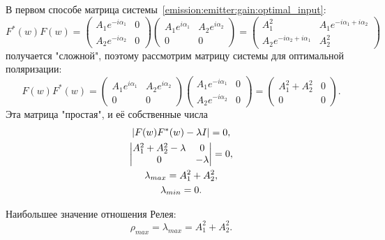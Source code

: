 В первом способе матрица системы~\eqref{emission:emitter:gain:optimal_input}:
\[
    F^*(w) F(w)
    =
    \begin{pmatrix}
        A_1 e^{-i \alpha_1} & 0 \\
        A_2 e^{-i \alpha_2} & 0
    \end{pmatrix}
    \begin{pmatrix}
        A_1 e^{i \alpha_1} & A_2 e^{i \alpha_2} \\
        0                  & 0
    \end{pmatrix}
    =
    \begin{pmatrix}
        A_1^2                            & A_1 e^{-i \alpha_1 + i \alpha_2} \\
        A_2 e^{-i \alpha_2 + i \alpha_1} & A_2^2
    \end{pmatrix}
\]
получается "сложной"{}, поэтому рассмотрим матрицу системы для оптимальной поляризации:
\[
    F(w) F^*(w)
    =
    \begin{pmatrix}
        A_1 e^{i \alpha_1} & A_2 e^{i \alpha_2} \\
        0                  & 0
    \end{pmatrix}
    \begin{pmatrix}
        A_1 e^{-i \alpha_1} & 0 \\
        A_2 e^{-i \alpha_2} & 0
    \end{pmatrix}
    =
    \begin{pmatrix}
        A_1^2 + A_2^2 & 0 \\
        0             & 0
    \end{pmatrix} .
\]
Эта матрица "простая"{}, и её собственные числа
\begin{gather*}
    \determinant{F(w)F^*(w) - \lambda I} = 0 , \\
%
    \begin{vmatrix}
        A_1^2 + A_2^2 - \lambda & 0         \\
        0                       & - \lambda
    \end{vmatrix} = 0, \\
%
    \lambda_{max} = A_1^2 + A_2^2 , \\
    \lambda_{min} = 0 .
\end{gather*}

Наибольшее значение отношения Релея:
\[
    \rho_{max} = \lambda_{max} = A_1^2 + A_2^2.
\]

